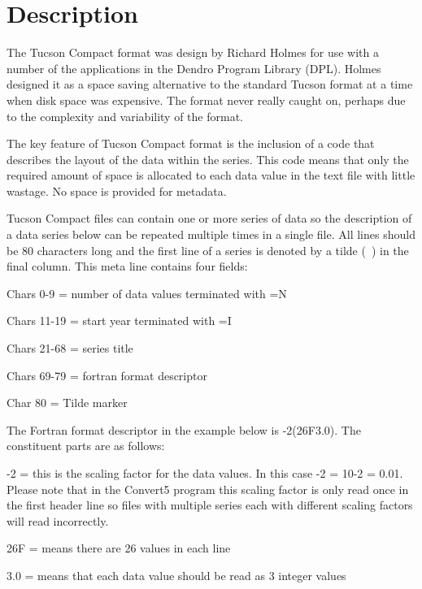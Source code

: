 \section{Description}


The Tucson Compact format was design by Richard Holmes for use with a number of the applications in the Dendro Program Library (DPL). Holmes designed it as a space saving alternative to the standard Tucson format at a time when disk space was expensive. The format never really caught on, perhaps due to the complexity and variability of the format.

The key feature of Tucson Compact format is the inclusion of a code that describes the layout of the data within the series. This code means that only the required amount of space is allocated to each data value in the text file with little wastage. No space is provided for metadata.

Tucson Compact files can contain one or more series of data so the description of a data series below can be repeated multiple times in a single file. All lines should be 80 characters long and the first line of a series is denoted by a tilde (~) in the final column. This meta line contains four fields:

\begin{itemize*}
    \item  Chars 0-9 = number of data values terminated with =N
    \item  Chars 11-19 = start year terminated with =I
    \item  Chars 21-68 = series title
    \item  Chars 69-79 = fortran format descriptor
    \item  Char 80 = Tilde marker 
\end{itemize*}

The Fortran format descriptor in the example below is -2(26F3.0). The constituent parts are as follows:

\begin{itemize*}
    \item  -2 = this is the scaling factor for the data values. In this case -2 = 10-2 = 0.01. Please note that in the Convert5 program this scaling factor is only read once in the first header line so files with multiple series each with different scaling factors will read incorrectly. 
    \item  26F = means there are 26 values in each line
    \item  3.0 = means that each data value should be read as 3 integer values 
\end{itemize*}

